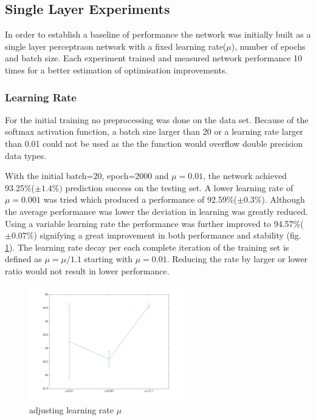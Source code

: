 \documentclass[11]{article}
\begin{document}
\subsection{Single Layer Experiments}
In order to establish a baseline of performance the network was initially built as a single layer perceptraon network with a fixed learning rate($\mu$), number of epochs and batch size. Each experiment trained and measured network performance 10 times for a better estimation of optimisation improvements. 

\subsubsection{Learning Rate}

For the initial training no preprocessing was done on the data set. Because of the softmax activation function, a batch size larger than 20 or a learning rate larger than 0.01 could not be used as the the function would overflow double precision data types.

With the initial batch=20, epoch=2000 and $\mu=0.01$, the network achieved 93.25\%($\pm 1.4\%)$ prediction success on the testing set.  A lower learning rate of $\mu=0.001$ was tried which produced a performance of 92.59\%($\pm 0.3\%$). Although the average performance was lower the deviation in learning was greatly reduced. Using a variable learning rate the performance was further improved to 94.57\%($\pm 0.07\%$) signifying a great improvement in both performance and stability (fig. \ref{fig:learningrate}). The learning rate decay per each complete iteration of the training set is defined as $\mu = \mu / 1.1$ starting with $\mu=0.01$. Reducing the rate by larger or lower ratio would not result in lower performance.
\begin{figure}[h]
\centering
\includegraphics[width=0.6\textwidth]{learning_rate.png}
\caption{adjusting learning rate $\mu$}
\label{fig:learningrate}
\end{figure}
\end{document}
